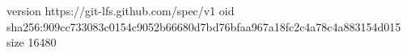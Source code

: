 version https://git-lfs.github.com/spec/v1
oid sha256:909cc733083c0154c9052b66680d7bd76bfaa967a18fc2c4a78c4a883154d015
size 16480
